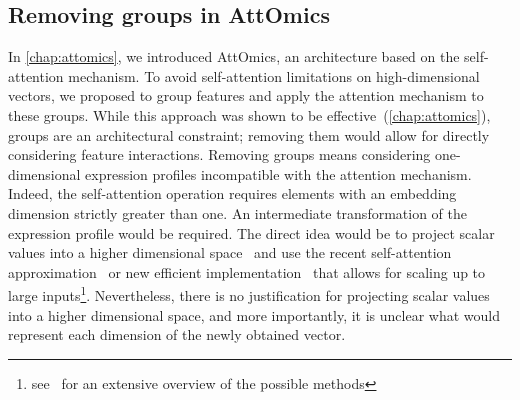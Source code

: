 \documentclass[../main.tex]{subfiles}
\begin{document}
	\subsection{Removing groups in AttOmics}\label{sec:scalar_attention}
		In \cref{chap:attomics}, we introduced AttOmics, an architecture based on the self-attention mechanism.
		To avoid self-attention limitations on high-dimensional vectors, we proposed to group features and apply the attention mechanism to these groups.
		While this approach was shown to be effective~(\cref{chap:attomics}), groups are an architectural constraint; removing them would allow for directly considering feature interactions.
		Removing groups means considering one-dimensional expression profiles incompatible with the attention mechanism.
		Indeed, the self-attention operation requires elements with an embedding dimension strictly greater than one.
		An intermediate transformation of the expression profile would be required.
		The direct idea would be to project scalar values into a higher dimensional space~\cite{gorishniy2021revisiting} and use the recent self-attention approximation~\cite{xiongNystrOmformerNystr2021,Linformer} or new efficient implementation~\cite{FlashAttention,rabeSelfattentionDoesNot2021,bolyaHydraAttentionEfficient2022a} that allows for scaling up to large inputs\footnote{see~\cite{EfficientTransformers} for an extensive overview of the possible methods}.
		Nevertheless, there is no justification for projecting scalar values into a higher dimensional space, and more importantly, it is unclear what would represent each dimension of the newly obtained vector.
\end{document}

